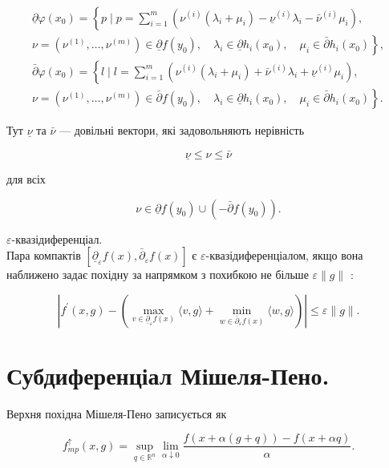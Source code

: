\documentclass[12pt,a4paper]{extarticle}
\numberwithin{section}{part}
\begin{document}
$$
\begin{array}{r}
\underline{\partial} \varphi\left(x_{0}\right)=\left\{p \mid p=\sum_{i=1}^{m}\left(\nu^{(i)}\left(\lambda_{i}+\mu_{i}\right)-\underline{\nu}^{(i)} \lambda_{i}-\bar{\nu}^{(i)} \mu_{i}\right),\right. \\
\left.\nu=\left(\nu^{(1)}, \ldots, \nu^{(m)}\right) \in \underline{\partial} f\left(y_{0}\right), \quad \lambda_{i} \in \underline{\partial} h_{i}\left(x_{0}\right), \quad \mu_{i} \in \bar{\partial} h_{i}\left(x_{0}\right)\right\}, \\
\bar{\partial} \varphi\left(x_{0}\right)=\left\{l \mid l=\sum_{i=1}^{m}\left(\nu^{(i)}\left(\lambda_{i}+\mu_{i}\right)+\bar{\nu}^{(i)} \lambda_{i}+\underline{\nu}^{(i)} \mu_{i}\right),\right. \\
\left.\nu=\left(\nu^{(1)}, \ldots, \nu^{(m)}\right) \in \bar{\partial} f\left(y_{0}\right), \quad \lambda_{i} \in \underline{\partial} h_{i}\left(x_{0}\right), \quad \mu_{i} \in \bar{\partial} h_{i}\left(x_{0}\right)\right\} .
\end{array}
$$

Тут $\underline{\nu}$ та $\bar{\nu}$ --- довільні вектори, які задовольняють нерівність

$$
\underline{\nu} \leq \nu \leq \bar{\nu}
$$

для всіх

$$
\nu \in \underline{\partial} f\left(y_{0}\right) \cup\left(-\bar{\partial} f\left(y_{0}\right)\right) .
$$

$\varepsilon$-квазідиференціал.\\
Пара компактів $\left[\underline{\partial}_{\varepsilon} f(x), \bar{\partial}_{\varepsilon} f(x)\right]$ є $\varepsilon$-квазідиференціалом, якщо вона наближено задає похідну за напрямком з похибкою не більше $\varepsilon\|g\|$ :

$$
\left|f^{\prime}(x, g)-\left(\max _{v \in \underline{\partial}_{\varepsilon} f(x)}\langle v, g\rangle+\min _{w \in \bar{\partial}_{\varepsilon} f(x)}\langle w, g\rangle\right)\right| \leq \varepsilon\|g\| .
$$

\section{Субдиференціал Мішеля-Пено.}
Верхня похідна Мішеля-Пено записується як

$$
f_{m p}^{\uparrow}(x, g)=\sup _{q \in \mathbb{R}^{n}} \lim _{\alpha \downarrow 0} \frac{f(x+\alpha(g+q))-f(x+\alpha q)}{\alpha} .
$$
\end{document}
